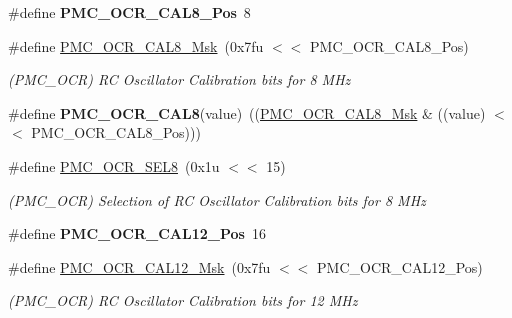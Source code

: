 \begin{DoxyCompactItemize}
\mbox{\label{group__SAMS70__PMC_gaeae5979b2df8f5a8d390e59e0e88dc6b}} 
\#define {\bfseries P\+M\+C\+\_\+\+O\+C\+R\+\_\+\+C\+A\+L8\+\_\+\+Pos}~8
\item 
\mbox{\label{group__SAMS70__PMC_gaa11a6b2f86faf3641f789b99e88f3413}} 
\#define \mbox{\hyperlink{group__SAMS70__PMC_gaa11a6b2f86faf3641f789b99e88f3413}{P\+M\+C\+\_\+\+O\+C\+R\+\_\+\+C\+A\+L8\+\_\+\+Msk}}~(0x7fu $<$$<$ P\+M\+C\+\_\+\+O\+C\+R\+\_\+\+C\+A\+L8\+\_\+\+Pos)
\begin{DoxyCompactList}\small\item\em (P\+M\+C\+\_\+\+O\+CR) RC Oscillator Calibration bits for 8 M\+Hz \end{DoxyCompactList}\item 
\mbox{\label{group__SAMS70__PMC_ga914c02dfef2c0a80f6ab649772016836}} 
\#define {\bfseries P\+M\+C\+\_\+\+O\+C\+R\+\_\+\+C\+A\+L8}(value)~((\mbox{\hyperlink{group__SAMV71__PMC_gaa11a6b2f86faf3641f789b99e88f3413}{P\+M\+C\+\_\+\+O\+C\+R\+\_\+\+C\+A\+L8\+\_\+\+Msk}} \& ((value) $<$$<$ P\+M\+C\+\_\+\+O\+C\+R\+\_\+\+C\+A\+L8\+\_\+\+Pos)))
\item 
\mbox{\label{group__SAMS70__PMC_ga78fbc712afb0e5fbacf4cf74ca649d5d}} 
\#define \mbox{\hyperlink{group__SAMS70__PMC_ga78fbc712afb0e5fbacf4cf74ca649d5d}{P\+M\+C\+\_\+\+O\+C\+R\+\_\+\+S\+E\+L8}}~(0x1u $<$$<$ 15)
\begin{DoxyCompactList}\small\item\em (P\+M\+C\+\_\+\+O\+CR) Selection of RC Oscillator Calibration bits for 8 M\+Hz \end{DoxyCompactList}\item 
\mbox{\label{group__SAMS70__PMC_ga487cc6f01c426ec8d88d53833cadd948}} 
\#define {\bfseries P\+M\+C\+\_\+\+O\+C\+R\+\_\+\+C\+A\+L12\+\_\+\+Pos}~16
\item 
\mbox{\label{group__SAMS70__PMC_gaebcde6b9f684f22e620db9673ab3131a}} 
\#define \mbox{\hyperlink{group__SAMS70__PMC_gaebcde6b9f684f22e620db9673ab3131a}{P\+M\+C\+\_\+\+O\+C\+R\+\_\+\+C\+A\+L12\+\_\+\+Msk}}~(0x7fu $<$$<$ P\+M\+C\+\_\+\+O\+C\+R\+\_\+\+C\+A\+L12\+\_\+\+Pos)
\begin{DoxyCompactList}\small\item\em (P\+M\+C\+\_\+\+O\+CR) RC Oscillator Calibration bits for 12 M\+Hz \end{DoxyCompactList}\item 

\end{DoxyCompactItemize}
